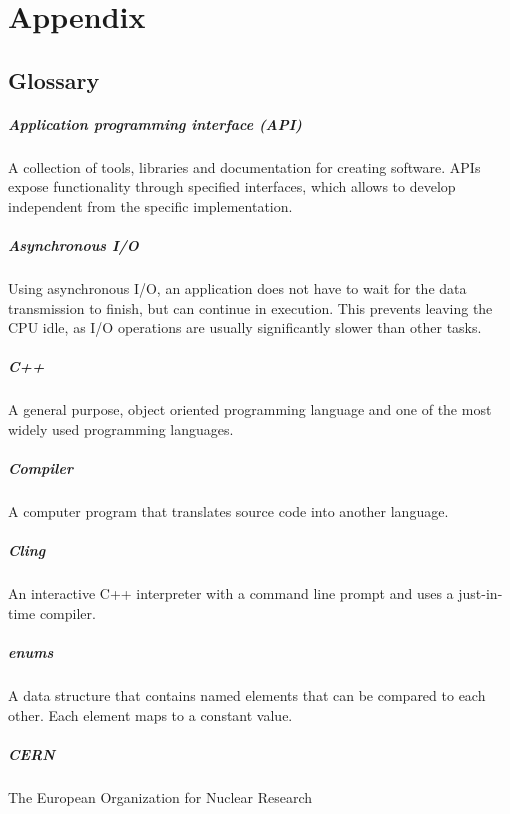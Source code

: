 \chapter{Appendix}
\section{Glossary}
\paragraph{Application programming interface (API)}
A collection of tools, libraries and documentation for creating software. APIs expose functionality through specified interfaces, which allows to develop independent from the specific implementation.
\paragraph{Asynchronous I/O}
Using asynchronous I/O, an application does not have to wait for the data transmission to finish, but can continue in execution. This prevents leaving the CPU idle, as I/O operations are usually significantly slower than other tasks.
\paragraph{C++}
A general purpose, object oriented programming language and one of the most widely used programming languages.

\paragraph{Compiler}
A computer program that translates source code into another language.
\paragraph{Cling}
An interactive C++ interpreter with a command line prompt and uses a just-in-time compiler.

\paragraph{enums}
A data structure that contains named elements that can be compared to each other. Each element maps to a constant value.

\paragraph{CERN}
The European Organization for Nuclear Research

